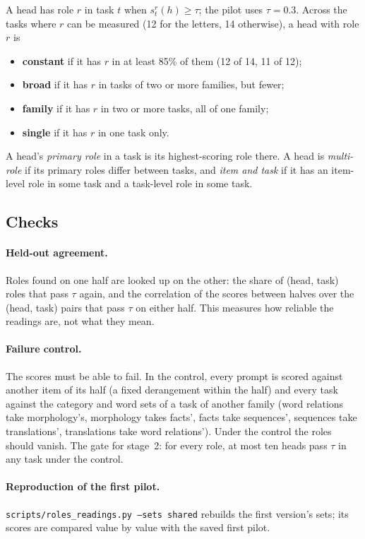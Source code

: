 \documentclass[10pt,a4paper]{article}
\begin{document}
A head has role $r$ in task $t$ when $s^r_t(h)\ge\tau$; the pilot uses $\tau=0.3$. Across the tasks where $r$ can be measured (12 for the letters, 14 otherwise), a head with role $r$ is
\begin{itemize}
\item \textbf{constant} if it has $r$ in at least 85\% of them (12 of 14, 11 of 12);
\item \textbf{broad} if it has $r$ in tasks of two or more families, but fewer;
\item \textbf{family} if it has $r$ in two or more tasks, all of one family;
\item \textbf{single} if it has $r$ in one task only.
\end{itemize}
A head's \emph{primary role} in a task is its highest-scoring role there. A head is \emph{multi-role} if its primary roles differ between tasks, and \emph{item and task} if it has an item-level role in some task and a task-level role in some task.

\subsection{Checks}\label{sec:checks}

\paragraph{Held-out agreement.} Roles found on one half are looked up on the other: the share of (head, task) roles that pass $\tau$ again, and the correlation of the scores between halves over the (head, task) pairs that pass $\tau$ on either half. This measures how reliable the readings are, not what they mean.

\paragraph{Failure control.} The scores must be able to fail. In the control, every prompt is scored against another item of its half (a fixed derangement within the half) and every task against the category and word sets of a task of another family (word relations take morphology's, morphology takes facts', facts take sequences', sequences take translations', translations take word relations'). Under the control the roles should vanish. The gate for stage~2: for every role, at most ten heads pass $\tau$ in any task under the control.

\paragraph{Reproduction of the first pilot.} \texttt{scripts/roles\_readings.py --sets shared} rebuilds the first version's sets; its scores are compared value by value with the saved first pilot.
\end{document}
